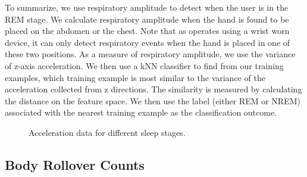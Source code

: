 To summarize, we use respiratory amplitude to detect when the user is in the REM stage.  We calculate respiratory amplitude when the hand is found to be placed on the abdomen or the chest. {Note that as {\systemname} operates using a wrist worn device, it can only detect respiratory events when the hand is placed in one of these two positions. As a measure of respiratory amplitude, we use} the variance of z-axis acceleration. We then use a kNN classifier to find from our training examples, which training example is most similar to the variance of the acceleration collected from z directions. The similarity is measured by calculating the distance on the feature space. We then use the label (either REM or NREM) associated with the nearest training example as the classification outcome.

\begin{figure}[!t]
	\centering
	\caption{Acceleration data for different sleep stages.}\label{fig:cordi}
\end{figure}

\subsection{Body Rollover Counts \label{sec:bodyrollover}}

